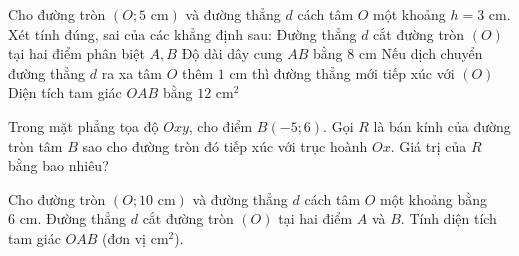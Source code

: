 \begin{ex}%
	Cho đường tròn $(O; 5\text{ cm})$ và đường thẳng $d$ cách tâm $O$ một khoảng $h = 3\text{ cm}$. Xét tính đúng, sai của các khẳng định sau:
	\choiceTF
	{\True Đường thẳng $d$ cắt đường tròn $(O)$ tại hai điểm phân biệt $A, B$}
	{\True Độ dài dây cung $AB$ bằng $8\text{ cm}$}
	{Nếu dịch chuyển đường thẳng $d$ ra xa tâm $O$ thêm $1\text{ cm}$ thì đường thẳng mới tiếp xúc với $(O)$}
	{\True Diện tích tam giác $OAB$ bằng $12\text{ cm}^2$}
\end{ex}

\begin{bt}%
	Trong mặt phẳng tọa độ $Oxy$, cho điểm $B(-5; 6)$. Gọi $R$ là bán kính của đường tròn tâm $B$ sao cho đường tròn đó tiếp xúc với trục hoành $Ox$. Giá trị của $R$ bằng bao nhiêu?
\end{bt}

\begin{bt}%
	Cho đường tròn $(O; 10\text{ cm})$ và đường thẳng $d$ cách tâm $O$ một khoảng bằng $6\text{ cm}$. Đường thẳng $d$ cắt đường tròn $(O)$ tại hai điểm $A$ và $B$. Tính diện tích tam giác $OAB$ (đơn vị $\text{cm}^2$).
\end{bt}


